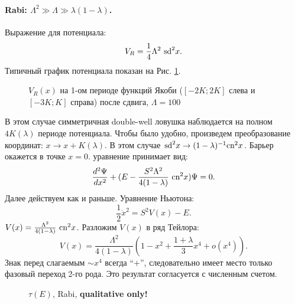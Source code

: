 \documentclass[12pt]{article}
\begin{document}
\paragraph{Rabi: $\Lambda^2 \gg \Lambda \gg \lambda(1 - \lambda)$.}
Выражение для потенциала:
%
\begin{equation}
V_R = \frac{1}{4} \Lambda^2 ~\textrm{sd}^2 x.
\end{equation}
%
Типичный график потенциала показан на Рис. \ref{pic:potential_rabi}.
%
\begin{figure}[Ht!]
\caption{$V_R (x)$ на 1-ом периоде функций Якоби ($[-2K; 2K]$ слева и $[-3K; K]$ справа) после сдвига, $\Lambda = 100$}
\label{pic:potential_rabi}
\end{figure}
%
В этом случае симметричная double-well ловушка наблюдается на полном $4K(\lambda)$ периоде потенциала.
Чтобы было удобно, произведем преобразование координат: $x \to x + K(\lambda)$.
В этом случае $\textrm{sd}^2 x \to (1 - \lambda)^{-1} \textrm{cn}^2 x$.
Барьер окажется в точке $x = 0$.
уравнение принимает вид:
%
\begin{equation}
\frac{d^2 \Psi}{dx^2} + (E - \frac{S^2 \Lambda^2}{4 (1 - \lambda)} ~\textrm{cn}^2 x) \Psi = 0.
\end{equation}
%
Далее действуем как и раньше.
Уравнение Ньютона:
%
\begin{equation}
\frac{1}{2} \dot{x}^2 = S^2 V(x) - E.
\end{equation}
%
$V(x) = \frac{\Lambda^2}{4(1 - \lambda)} ~\textrm{cn}^2 x$.
Разложим $V(x)$ в ряд Тейлора:
%
\begin{equation}
V(x) = \frac{\Lambda^2}{4(1 - \lambda)} (1 - x^2 + \frac{1 + \lambda}{3} x^4 + o(x^4)).
\end{equation}
%
Знак перед слагаемым $\sim x^4$ всегда ``$+$'', следовательно имеет место только фазовый переход 2-го рода.
Это результат согласуется с численным счетом.
%
\begin{figure}[Ht!]
\caption{$\tau(E)$, Rabi, {\bf qualitative only!}}
\end{figure}
%
\end{document}
